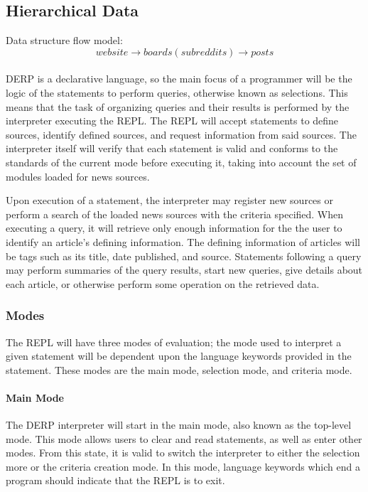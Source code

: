 \subsection{Hierarchical Data}
Data structure flow model: $$website \rightarrow boards (subreddits) \rightarrow posts$$\\
DERP is a declarative language, so the main focus of a programmer will be the logic of the statements to perform queries, otherwise known as selections. This means that the task of organizing queries and their results is performed by the interpreter executing the REPL. The REPL will accept statements to define sources, identify defined sources, and request information from said sources. The interpreter itself will verify that each statement is valid and conforms to the standards of the current mode before executing it, taking into account the set of modules loaded for news sources.

Upon execution of a statement, the interpreter may register new sources or perform a search of the loaded news sources with the criteria specified. When executing a query, it will retrieve only enough information for the the user to identify an article's defining information. The defining information of articles will be tags such as its title, date published, and source. Statements following a query may perform summaries of the query results, start new queries, give details about each article, or otherwise perform some operation on the retrieved data.


\subsubsection{Modes}
The REPL will have three modes of evaluation; the mode used to interpret a given statement will be dependent upon the language keywords provided in the statement. These modes are the main mode, selection mode, and criteria mode.

\paragraph{Main Mode}

The DERP interpreter will start in the main mode, also known as the top-level mode. This mode allows users to clear and read statements, as well as enter other modes. From this state, it is valid to switch the interpreter to either the selection more or the criteria creation mode. In this mode, language keywords which end a program should indicate that the REPL is to exit.

